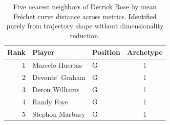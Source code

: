 \begin{table}[htbp]
  \centering\small
  \begin{tabular}{rllc}
    \toprule
    Rank & Player & Position & Archetype \\
    \midrule
    1 & Marcelo Huertas & G & 1 \\
    2 & Devonte' Graham & G & 1 \\
    3 & Deron Williams & G & 1 \\
    4 & Randy Foye & G & 1 \\
    5 & Stephon Marbury & G & 1 \\
    \bottomrule
  \end{tabular}
  \caption{Five nearest neighbors of Derrick Rose by mean Fr\'{e}chet curve distance across metrics. Identified purely from trajectory shape without dimensionality reduction.}
  \label{tab:Derrick_Rose_frechet_curve_neighbors}
\end{table}


